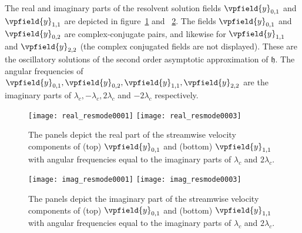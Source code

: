The real and imaginary parts of the resolvent solution fields $\vpfield{y}_{0,1}$ and $\vpfield{y}_{1,1}$ are depicted in figure~\ref{fig:resolvents_oscillatory_real} and ~\ref{fig:resolvents_oscillatory_imag}. The fields $\vpfield{y}_{0,1}$ and $\vpfield{y}_{0,2}$ are complex-conjugate pairs, and likewise for $\vpfield{y}_{1,1}$ and $\vpfield{y}_{2,2}$ (the complex conjugated fields are not displayed). These are the oscillatory solutions of the second order asymptotic approximation of $\mathfrak{h}$. The angular frequencies of $\vpfield{y}_{0,1}, \vpfield{y}_{0,2}, \vpfield{y}_{1,1}, \vpfield{y}_{2,2}$ are the imaginary parts of $\lambda_{c},-\lambda_{c},2\lambda_{c}$ and $-2\lambda_{c}$ respectively. 
\begin{figure}
	\centering
	\texttt{[image: real\_resmode0001]}
	\texttt{[image: real\_resmode0003]}
	\caption{The panels depict the real part of the streamwise velocity components of (top) $\vpfield{y}_{0,1}$ and (bottom) $\vpfield{y}_{1,1}$ with angular frequencies equal to the imaginary parts of $\lambda_{c}$ and $2\lambda_{c}$.}
	\label{fig:resolvents_oscillatory_real}
\end{figure}
\begin{figure}
	\centering
	\texttt{[image: imag\_resmode0001]}
	\texttt{[image: imag\_resmode0003]}
	\caption{The panels depict the imaginary part of the streamwise velocity components of (top) $\vpfield{y}_{0,1}$ and (bottom) $\vpfield{y}_{1,1}$ with angular frequencies equal to the imaginary parts of $\lambda_{c}$ and $2\lambda_{c}$.}
	\label{fig:resolvents_oscillatory_imag}
\end{figure}
